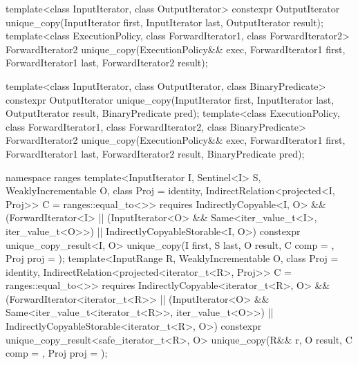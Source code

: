 %
\begin{itemdecl}
template<class InputIterator, class OutputIterator>
  constexpr OutputIterator
    unique_copy(InputIterator first, InputIterator last,
                OutputIterator result);
template<class ExecutionPolicy, class ForwardIterator1, class ForwardIterator2>
  ForwardIterator2
    unique_copy(ExecutionPolicy&& exec,
                ForwardIterator1 first, ForwardIterator1 last,
                ForwardIterator2 result);

template<class InputIterator, class OutputIterator,
         class BinaryPredicate>
  constexpr OutputIterator
    unique_copy(InputIterator first, InputIterator last,
                OutputIterator result, BinaryPredicate pred);
template<class ExecutionPolicy, class ForwardIterator1, class ForwardIterator2,
         class BinaryPredicate>
  ForwardIterator2
    unique_copy(ExecutionPolicy&& exec,
                ForwardIterator1 first, ForwardIterator1 last,
                ForwardIterator2 result, BinaryPredicate pred);

namespace ranges {
  template<InputIterator I, Sentinel<I> S, WeaklyIncrementable O,
           class Proj = identity, IndirectRelation<projected<I, Proj>> C = ranges::equal_to<>>
    requires IndirectlyCopyable<I, O> &&
             (ForwardIterator<I> ||
              (InputIterator<O> && Same<iter_value_t<I>, iter_value_t<O>>) ||
              IndirectlyCopyableStorable<I, O>)
    constexpr unique_copy_result<I, O>
      unique_copy(I first, S last, O result, C comp = {}, Proj proj = {});
  template<InputRange R, WeaklyIncrementable O, class Proj = identity,
           IndirectRelation<projected<iterator_t<R>, Proj>> C = ranges::equal_to<>>
    requires IndirectlyCopyable<iterator_t<R>, O> &&
             (ForwardIterator<iterator_t<R>> ||
              (InputIterator<O> && Same<iter_value_t<iterator_t<R>>, iter_value_t<O>>) ||
              IndirectlyCopyableStorable<iterator_t<R>, O>)
    constexpr unique_copy_result<safe_iterator_t<R>, O>
      unique_copy(R&& r, O result, C comp = {}, Proj proj = {});
}
\end{itemdecl}

